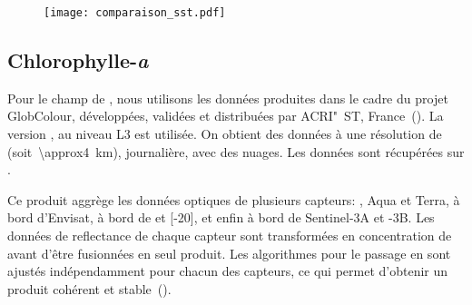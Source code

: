
\begin{figure}
  \texttt{[image: comparaison\_sst.pdf]}
  \label{fig:comparaison-sst}
\end{figure}

\subsection{Chlorophylle-\emph{a}}
\label{sec:donnees-chl}

Pour le champ de , nous utilisons les données produites dans le cadre du projet GlobColour, développées, validées et distribuées par ACRI"~ST, France~(\cite{maritorena_2002}).
La version , au niveau L3 est utilisée.
On obtient des données à une résolution de~ (soit~\qty{\approx4}{\km}), journalière, avec des nuages.
Les données sont récupérées sur .

Ce produit aggrège les données optiques de plusieurs capteurs: ,  Aqua et Terra,  à bord d'Envisat,  à bord de  et [-20], et enfin  à bord de Sentinel-3A et -3B.
Les données de reflectance de chaque capteur sont transformées en concentration de  avant d'être fusionnées en seul produit.
Les algorithmes pour le passage en  sont ajustés indépendamment pour chacun des capteurs, ce qui permet d'obtenir un produit cohérent et stable~(\cite{garnesson_2019}).


